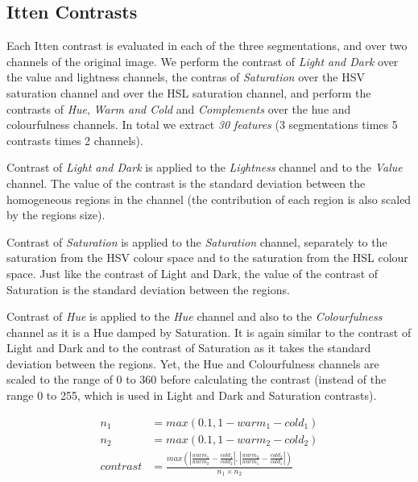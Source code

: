 \documentclass[11pt,a4paper,twoside,openright,draft]{report}
\begin{document}
\begin{multicols}{2}
\subsection{Itten Contrasts}

Each Itten contrast is evaluated in each of the three segmentations, and over
two channels of the original image.  We perform the contrast of \emph{Light and
Dark} over the value and lightness channels, the contras of \emph{Saturation}
over the HSV saturation channel and over the HSL saturation channel, and
perform the contrasts of \emph{Hue}, \emph{Warm and Cold} and
\emph{Complements} over the hue and colourfulness channels.  In total we
extract \emph{30 features} (3 segmentations times 5 contrasts times 2
channels).

Contrast of \emph{Light and Dark} is applied to the \emph{Lightness} channel
and to the \emph{Value} channel. The value of the contrast is the standard
deviation between the homogeneous regions in the channel (the contribution of
each region is also scaled by the regions size).

Contrast of \emph{Saturation} is applied to the \emph{Saturation} channel,
separately to the saturation from the HSV colour space and to the saturation
from the HSL colour space.  Just like the contrast of Light and Dark, the value
of the contrast of Saturation is the standard deviation between the regions.

Contrast of \emph{Hue} is applied to the \emph{Hue} channel and also to the
\emph{Colourfulness} channel as it is a Hue damped by Saturation.  It is again
similar to the contrast of Light and Dark and to the contrast of Saturation as
it takes the standard deviation between the regions.  Yet, the Hue and
Colourfulness channels are scaled to the range of 0 to 360 before calculating
the contrast (instead of the range 0 to 255, which is used in Light and Dark
and Saturation contrasts).

\begin{figure}[!htb]
\begin{equation}
\begin{aligned}
n_1       &= max(0.1, 1 - warm_1 - cold_1) \\
n_2       &= max(0.1, 1 - warm_2 - cold_2) \\
contrast  &= \frac{ max\left( \left\lvert \frac{warm_1}{warm_2}
                                        - \frac{cold_1}{cold_2} \right\rvert
                            , \left\lvert \frac{warm_2}{warm_1}
                                        - \frac{cold_2}{cold_1} \right\rvert
                       \right)
                 }{ n_1 \times n_2 }
\label{eq:coldwarm}
\end{aligned}
\end{equation}
\end{figure}


\end{multicols}
\end{document}
